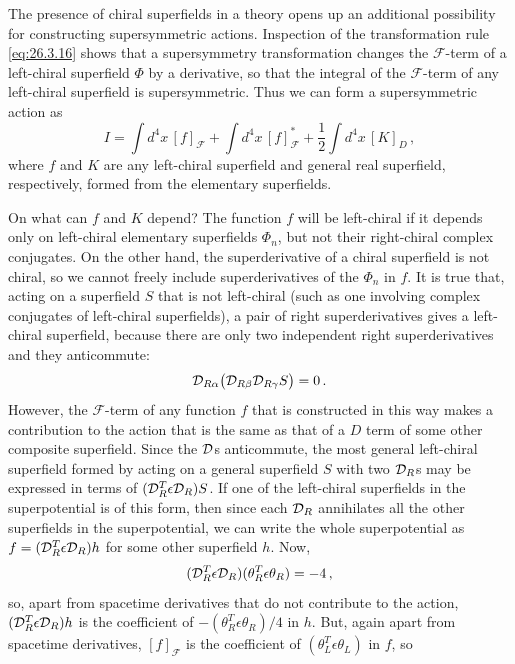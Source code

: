 The presence of chiral superfields in a theory opens up an additional
possibility for constructing supersymmetric actions. Inspection of the
transformation rule \eqref{eq:26.3.16} shows that a supersymmetry
transformation changes the $\mathcal{F}$-term of a left-chiral superfield
$\Phi$ by a derivative, so that the integral of the $\mathcal{F}$-term of any
left-chiral superfield is supersymmetric. Thus we can form a supersymmetric
action as
\begin{equation}
  I=\int d^4x\,[f]_{\mathcal{F}}
  +\int d^4x\,[f]_{\mathcal{F}}^*
  +\frac12\int d^4x\,[K]_D\,,
  \tag{26.3.30}\label{eq:26.3.30}
\end{equation}
where $f$ and $K$ are any left-chiral superfield and general real superfield,
respectively, formed from the elementary superfields.

On what can $f$ and $K$ depend? The function $f$ will be left-chiral if it
depends only on left-chiral elementary superfields $\Phi_n$, but not their
right-chiral complex conjugates. On the other hand, the superderivative of a
chiral superfield is not chiral, so we cannot freely include superderivatives
of the $\Phi_n$ in $f$. It is true that, acting on a superfield $S$ that is not
left-chiral (such as one involving complex conjugates of left-chiral
superfields), a pair of right superderivatives gives a left-chiral superfield,
because there are only two independent right superderivatives and they
anticommute:
\[
  \mathcal{D}_{R\alpha}
  \bigl(\mathcal{D}_{R\beta}\mathcal{D}_{R\gamma}S\bigr)=0\,.
\]
However, the $\mathcal{F}$-term of any function $f$ that is constructed in
this way makes a contribution to the action that is the same as that of a
$D$ term of some other composite superfield. Since the $\mathcal{D}$s
anticommute, the most general left-chiral superfield formed by acting on a
general superfield $S$ with two $\mathcal{D}_R$s may be expressed in terms of
$(\mathcal{D}_R^T\epsilon\mathcal{D}_R)S$. If one of the left-chiral superfields in
the superpotential is of this form, then since each $\mathcal{D}_R$ annihilates
all the other superfields in the superpotential, we can write the whole
superpotential as $f=(\mathcal{D}_R^T\epsilon\mathcal{D}_R)h$ for some other
superfield $h$. Now,
\[
  (\mathcal{D}_R^T\epsilon\mathcal{D}_R)
  (\theta_R^T\epsilon\theta_R)=-4\,,
\]
so, apart from spacetime derivatives that do not contribute to the action,
$(\mathcal{D}_R^T\epsilon\mathcal{D}_R)h$ is the coefficient of
$-(\theta_R^T\epsilon\theta_R)/4$ in $h$. But, again apart from spacetime
derivatives, $[f]_{\mathcal{F}}$ is the coefficient of
$(\theta_L^T\epsilon\theta_L)$ in $f$, so
